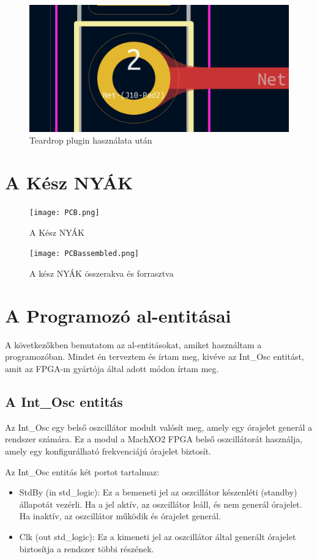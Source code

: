 \documentclass[a4paper,12pt,oneside]{book}
\begin{document}
\begin{figure}[H]
	\centering
	\includegraphics[trim=1mm 1mm 1mm 1mm,scale=0.4]{viaafter.PNG}
	\caption{Teardrop plugin használata után}
	\label{Teardrop plugin használata után} 
\end{figure}
\section{A Kész NYÁK}
\begin{figure}[H]
	\centering
	\texttt{[image: PCB.png]}
	\caption{A Kész NYÁK}
	\label{A kész NYÁK} 
\end{figure}
\begin{figure}[H]
	\centering
	\texttt{[image: PCBassembled.png]}
	\caption{A kész NYÁK összerakva és forrasztva}
	\label{A kész NYÁK összerakva és forrasztva} 
\end{figure}

\section{A Programozó al-entitásai}
A következőkben bemutatom az al-entitásokat, amiket használtam a programozóban. Mindet én terveztem és írtam meg, kivéve az Int\_Osc entitást, amit az FPGA-m gyártója által adott módon írtam meg.
\subsection{A Int\_Osc entitás}
Az Int\_Osc egy belső oszcillátor modult valósít meg, amely egy órajelet generál a rendszer számára. Ez a modul a MachXO2 FPGA belső oszcillátorát használja, amely egy konfigurálható frekvenciájú órajelet biztosít. 


Az Int\_Osc entitás két portot tartalmaz:
\begin{itemize}
	\item StdBy (in std\_logic): Ez a bemeneti jel az oszcillátor készenléti (standby) állapotát vezérli. Ha a jel aktív, az oszcillátor leáll, és nem generál órajelet. Ha inaktív, az oszcillátor működik és órajelet generál.
	\item Clk (out std\_logic): Ez a kimeneti jel az oszcillátor által generált órajelet biztosítja a rendszer többi részének.
\end{itemize}
\end{document}
